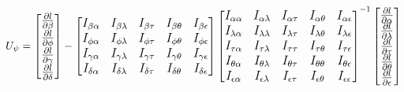 \documentclass[hidelinks]{article}
\begin{document}
\[
\large
U_{\psi} = \begin{bmatrix}\frac{\partial l }{\partial \beta} \\ \frac{\partial l }{\partial \phi} \\ \frac{\partial l }{\partial \gamma} \\  \frac{\partial l }{\partial \delta}  \end{bmatrix}
 - \begin{bmatrix} I_{\beta\alpha} & I_{\beta\lambda} & I_{\beta\tau}  &   I_{\beta\theta} & I_{\beta\epsilon}  \\  I_{\phi\alpha} &  I_{\phi\lambda} & I_{\phi\tau} &I_{\phi\theta} & I_{\phi\epsilon} \\ I_{\gamma\alpha} & I_{\gamma\lambda} &  I_{\gamma\tau} & I_{\gamma\theta} & I_{\gamma\epsilon} \\ I_{\delta\alpha} & I_{\delta\lambda} & I_{\delta\tau} & I_{\delta\theta} & I_{\delta\epsilon}  \end{bmatrix} \begin{bmatrix} I_{\alpha\alpha} & I_{\alpha\lambda} & I_{\alpha\tau} &  I_{\alpha\theta} & I_{\alpha\epsilon} \\ I_{\lambda\alpha} & I_{\lambda\lambda} & I_{\lambda\tau} &  I_{\lambda\theta} & I_{\lambda\epsilon }\\   I_{\tau\alpha} & I_{\tau\lambda} & I_{\tau\tau} &  I_{\tau\theta} &I_{\tau\epsilon }\\ I_{\theta\alpha} & I_{\theta\lambda} & I_{\theta\tau} &   I_{\theta\theta} &I_{\theta\epsilon}\\ I_{\epsilon\alpha} & I_{\epsilon\lambda} & I_{\epsilon\tau} & I_{\epsilon\theta} &I_{\epsilon\epsilon} \end{bmatrix}^{-1} \begin{bmatrix} \frac{\partial l}{\partial \alpha}  \\  \frac{\partial l}{\partial \lambda}  \\ \frac{\partial l}{\partial \tau}  \\   \frac{\partial l}{\partial \theta}  \\ \frac{\partial l}{\partial \epsilon} \end{bmatrix}
\]
%
\end{document}
